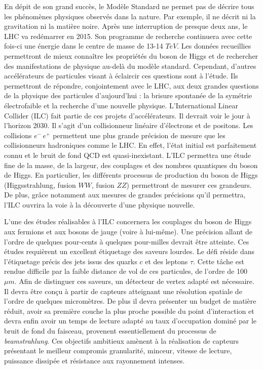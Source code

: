 \documentclass[a4paper,11pt]{report}
\begin{document}
En d\'epit de son grand succ\`es, le Mod\`ele Standard ne permet pas de d\'ecrire tous les ph\'enom\`enes physiques observ\'es dans la nature. Par exemple, il ne d\'ecrit ni la gravitation ni la mati\`ere noire. Après une interruption de presque deux ans, le LHC va red\'emarrer en 2015. Son programme de recherche continuera avec cette fois-ci une \'energie dans le centre de masse de 13-14 $TeV$. Les donn\'ees recueillies permettront de mieux connaître les propri\'et\'es du boson de Higgs et de rechercher des manifestations de physique au-delà du mod\`ele standard. Cependant, d'autres acc\'el\'erateurs de particules visant \`a \'eclaircir ces questions sont \`a l'\'etude. Ils permettront de r\'epondre, conjointement avec le LHC, aux deux grandes questions de la physique des particules d'aujourd'hui : la brisure spontan\'ee de la sym\'etrie \'electrofaible et la recherche d'une nouvelle physique. L'International Linear Collider (ILC) fait partie de ces projets d'acc\'el\'erateurs. Il devrait voir le jour \`a l'horizon 2030. Il s'agit d'un collisionneur lin\'eaire d'\'electrons et de positons. Les collisions $e^- \, e^+$ permettent une plus grande pr\'ecision de mesure que les collisionneurs hadroniques comme le LHC. En effet, l'\'etat initial est parfaitement connu et le bruit de fond QCD est quasi-inexistant. L'ILC permettra une \'etude fine de la masse, de la largeur, des couplages et des nombres quantiques du boson de Higgs. En particulier, les diff\'erents processus de production du boson de Higgs (Higgsstrahlung, fusion $WW$, fusion $ZZ$) permettront de mesurer ces grandeurs. De plus, gr\^ace notamment aux mesures de grandes pr\'ecisions qu'il permettra, l'ILC ouvrira la voie \`a la d\'ecouverte d'une physique nouvelle.

\medskip

L'une des \'etudes r\'ealisables \`a l'ILC concernera les couplages du boson de Higgs aux fermions et aux bosons de jauge (voire \`a lui-m\^eme). Une pr\'ecision allant de l'ordre de quelques pour-cents \`a quelques pour-milles devrait \^etre atteinte. Ces \'etudes requièrent un excellent \'etiquetage des saveurs lourdes. Le d\'efi r\'eside dans l'\'etiquetage pr\'ecis des jets issus des quarks $c$ et des leptons $\tau$. Cette t\^ache est rendue difficile par la faible distance de vol de ces particules, de l'ordre de 100 $\mu m$. Afin de distinguer ces saveurs, un d\'etecteur de vertex adapt\'e est n\'ecessaire. Il devra \^etre conçu \`a partir de capteurs atteignant une r\'esolution spatiale de l'ordre de quelques microm\`etres. De plus il devra pr\'esenter un budget de mati\`ere r\'eduit, avoir sa premi\`ere couche la plus proche possible du point d'interaction et devra enfin avoir un temps de lecture adapt\'e au taux d'occupation domin\'e par le bruit de fond du faisceau, provenent essentiellement du processus de \textit{beamstrahlung}. Ces objectifs ambitieux am\`enent \`a la r\'ealisation de capteurs pr\'esentant le meilleur compromis granularit\'e, minceur, vitesse de lecture, puissance dissip\'ee et r\'esistance aux rayonnement intenses.
\end{document}
